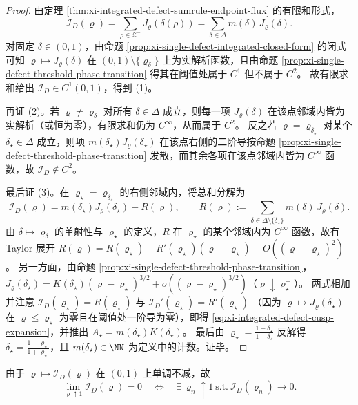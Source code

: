\begin{proof}
由定理 \ref{thm:xi-integrated-defect-sumrule-endpoint-flux} 的有限和形式，
\[
\mathcal{I}_D(\varrho)=\sum_{\rho\in\mathcal{Z}^-}J_{\varrho}(\delta(\rho))
=\sum_{\delta\in\Delta} m(\delta)\,J_{\varrho}(\delta).
\]
对固定 \(\delta\in(0,1)\)，由命题 \ref{prop:xi-single-defect-integrated-closed-form} 的闭式可知
\(\varrho\mapsto J_{\varrho}(\delta)\)
在 \((0,1)\setminus\{\varrho_\delta\}\) 上为实解析函数，且由命题 \ref{prop:xi-single-defect-threshold-phase-transition} 得其在阈值处属于 \(C^1\) 但不属于 \(C^2\)。
故有限求和给出 \(\mathcal{I}_D\in C^1(0,1)\)，得到 (1)。
\par
再证 (2)。若 \(\varrho\neq \varrho_\delta\) 对所有 \(\delta\in\Delta\) 成立，则每一项 \(J_{\varrho}(\delta)\) 在该点邻域内皆为实解析（或恒为零），有限求和仍为 \(C^\infty\)，从而属于 \(C^2\)。
反之若 \(\varrho=\varrho_{\delta_\star}\) 对某个 \(\delta_\star\in\Delta\) 成立，则项 \(m(\delta_\star)J_{\varrho}(\delta_\star)\) 在该点右侧的二阶导按命题 \ref{prop:xi-single-defect-threshold-phase-transition} 发散，而其余各项在该点邻域内皆为 \(C^\infty\) 函数，故 \(\mathcal{I}_D\notin C^2\)。
\par
最后证 (3)。在 \(\varrho_\star=\varrho_{\delta_\star}\) 的右侧邻域内，将总和分解为
\[
\mathcal{I}_D(\varrho)
=m(\delta_\star)J_{\varrho}(\delta_\star)+R(\varrho),
\qquad
R(\varrho):=\sum_{\delta\in\Delta\setminus\{\delta_\star\}} m(\delta)\,J_{\varrho}(\delta).
\]
由 \(\delta\mapsto \varrho_\delta\) 的单射性与 \(\varrho_\star\) 的定义，\(R\) 在 \(\varrho_\star\) 的某个邻域内为 \(C^\infty\) 函数，故有 Taylor 展开
\(
R(\varrho)=R(\varrho_\star)+R'(\varrho_\star)(\varrho-\varrho_\star)+O((\varrho-\varrho_\star)^2)
\)。
另一方面，由命题 \ref{prop:xi-single-defect-threshold-phase-transition}，
\(
J_{\varrho}(\delta_\star)
=K(\delta_\star)(\varrho-\varrho_\star)^{3/2}+o((\varrho-\varrho_\star)^{3/2})
\)（\(\varrho\downarrow \varrho_\star^+\)）。
两式相加并注意
\(
\mathcal{I}_D(\varrho_\star)=R(\varrho_\star)
\)
与
\(
\mathcal{I}_D'(\varrho_\star)=R'(\varrho_\star)
\)
（因为 \(\varrho\mapsto J_{\varrho}(\delta_\star)\) 在 \(\varrho\le \varrho_\star\) 为零且在阈值处一阶导为零），即得 \eqref{eq:xi-integrated-defect-cusp-expansion}，并推出 \(A_\star=m(\delta_\star)K(\delta_\star)\)。
最后由 \(\varrho_\star=\frac{1-\delta_\star}{1+\delta_\star}\) 反解得 \(\delta_\star=\frac{1-\varrho_\star}{1+\varrho_\star}\)，且 \(m(\delta_\star)\in\NN\) 为定义中的计数。证毕。
\end{proof}

\begin{remark}[端点零化的序列判据]\label{rem:xi-integrated-defect-sequence-criterion}
由于 \(\varrho\mapsto\mathcal{I}_D(\varrho)\) 在 \((0,1)\) 上单调不减，故
\[
\lim_{\varrho\uparrow 1}\mathcal{I}_D(\varrho)=0
\quad\Longleftrightarrow\quad
\exists\,\varrho_n\uparrow 1\ \text{s.t.}\ \mathcal{I}_D(\varrho_n)\to 0.
\]
\end{remark}

